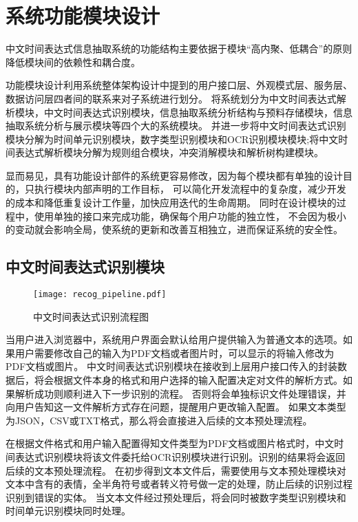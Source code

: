 \section{系统功能模块设计}

中文时间表达式信息抽取系统的功能结构主要依据于模块“高内聚、低耦合”的原则降低模块间的依赖性和耦合度。

功能模块设计利用系统整体架构设计中提到的用户接口层、外观模式层、服务层、数据访问层四者间的联系来对子系统进行划分。
将系统划分为中文时间表达式解析模块，中文时间表达式识别模块，信息抽取系统分析结构与预料存储模块，信息抽取系统分析与展示模块等四个大的系统模块。
并进一步将中文时间表达式识别模块分解为时间单元识别模块，数字类型识别模块和OCR识别模块模块;将中文时间表达式解析模块分解为规则组合模块，冲突消解模块和解析树构建模块。

显而易见，具有功能设计部件的系统更容易修改，因为每个模块都有单独的设计目的，只执行模块内部声明的工作目标，
可以简化开发流程中的复杂度，减少开发的成本和降低重复设计工作量，加快应用迭代的生命周期。
同时在设计模块的过程中，使用单独的接口来完成功能，确保每个用户功能的独立性，
不会因为极小的变动就会影响全局，使系统的更新和改善互相独立，进而保证系统的安全性。


\subsection{中文时间表达式识别模块}

\begin{figure}[h]
  \centering
  \texttt{[image: recog\_pipeline.pdf]}
  \caption{中文时间表达式识别流程图}
  \label{fig:recog_pipeline}
\end{figure}

当用户进入浏览器中，系统用户界面会默认给用户提供输入为普通文本的选项。如果用户需要修改自己的输入为PDF文档或者图片时，可以显示的将输入修改为PDF文档或图片。
中文时间表达式识别模块在接收到上层用户接口传入的封装数据后，将会根据文件本身的格式和用户选择的输入配置决定对文件的解析方式。如果解析成功则顺利进入下一步识别的流程。
否则将会单独标识文件处理错误，并向用户告知这一文件解析方式存在问题，提醒用户更改输入配置。
如果文本类型为JSON，CSV或TXT格式，那么将会直接进入后续的文本预处理流程。

在根据文件格式和用户输入配置得知文件类型为PDF文档或图片格式时，中文时间表达式识别模块将该文件委托给OCR识别模块进行识别。识别的结果将会返回后续的文本预处理流程。
在初步得到文本文件后，需要使用与文本预处理模块对文本中含有的表情，全半角符号或者转义符号做一定的处理，防止后续的识别过程识别到错误的实体。
当文本文件经过预处理后，将会同时被数字类型识别模块和时间单元识别模块同时处理。

